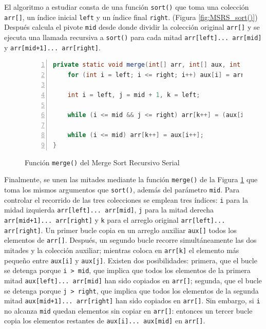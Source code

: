 \documentclass[titlepage]{article}
\begin{document}
El algoritmo a estudiar consta de una función \lstinline|sort()| que toma una colección \lstinline|arr[]|, un índice inicial \lstinline|left| y un índice final \lstinline|right|. (Figura \ref{fig:MSRS_sort()}) Después calcula el pivote \lstinline|mid| desde donde dividir la colección original \lstinline|arr[]| y se ejecuta una llamada recursiva a \lstinline|sort()| para cada mitad \lstinline|arr[left]... arr[mid]| y \lstinline|arr[mid+1]... arr[right]|.

\begin{figure}[h]
    \begin{lstlisting}[language=java, frame=single, numbers=left]
private static void merge(int[] arr, int[] aux, int left, int mid, int right) {
	for (int i = left; i <= right; i++) aux[i] = arr[i];
	
	int i = left, j = mid + 1, k = left;
	
	while (i <= mid && j <= right) arr[k++] = (aux[i] <= aux[j])? aux[i++] : aux[j++];
	
	while (i <= mid) arr[k++] = aux[i++];
}
    \end{lstlisting}
    \caption{Función \lstinline{merge()} del Merge Sort Recursivo Serial}
    \label{fig:MSRS_merge()}
\end{figure}

Finalmente, se unen las mitades mediante la función \lstinline|merge()| de la Figura \ref{fig:MSRS_merge()} que toma los mismos argumentos que \lstinline|sort()|, además del parámetro \lstinline|mid|. Para controlar el recorrido de las tres colecciones se emplean tres índices: \lstinline|i| para la midad izquierda \lstinline|arr[left]... arr[mid]|, \lstinline|j| para la mitad derecha \lstinline|arr[mid+1]... arr[right]| y \lstinline|k| para el arreglo original \lstinline|arr[left]... arr[right]|. Un primer bucle copia en un arreglo auxiliar \lstinline|aux[]| todos los elementos de \lstinline|arr[]|. Después, un segundo bucle recorre simultáneamente las dos mitades y la colección auxiliar; mientras coloca en \lstinline|arr[k]| el elemento más pequeño entre \lstinline|aux[i]| y \lstinline|aux[j]|. Existen dos posibilidades: primera, que el bucle se detenga porque \lstinline|i > mid|, que implica que todos los elementos de la primera mitad \lstinline|aux[left]... arr[mid]| han sido copiados en \lstinline|arr[]|; segunda, que el bucle se detenga porque \lstinline|j > right|, que implica que todos los elementos de la segunda mitad \lstinline|aux[mid+1]... arr[right]| han sido copiados en \lstinline|arr[]|. Sin embargo, si \lstinline|i| no alcanza \lstinline|mid| quedan elementos sin copiar en \lstinline|arr[]|: entonces un tercer bucle copia los elementos restantes de \lstinline|aux[i]... aux[mid]| en \lstinline|arr[]|.
\end{document}
